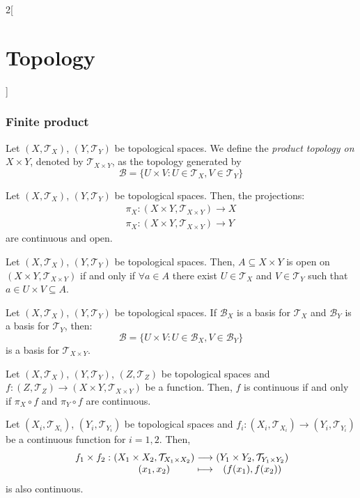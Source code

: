 \documentclass[../../../main.tex]{subfiles}
\begin{document}
\begin{multicols}{2}[\section{Topology}]
  \subsubsection{Finite product}
  \begin{definition}
    Let $(X,\mathcal{T}_X)$, $(Y,\mathcal{T}_Y)$ be topological spaces. We define the \textit{product topology on $X\times Y$}, denoted by $\mathcal{T}_{X\times Y}$, as the topology generated by $$\mathcal{B}=\{U\times V:U\in\mathcal{T}_X,V\in\mathcal{T}_Y\}$$
  \end{definition}
  \begin{prop}
    Let $(X,\mathcal{T}_X)$, $(Y,\mathcal{T}_Y)$ be topological spaces. Then, the projections:
    \begin{align*}
      \pi_X:(X\times Y,\mathcal{T}_{X\times Y})\longrightarrow X \\
      \pi_X:(X\times Y,\mathcal{T}_{X\times Y})\longrightarrow Y
    \end{align*}
    are continuous and open.
  \end{prop}
  \begin{prop}
    Let $(X,\mathcal{T}_X)$, $(Y,\mathcal{T}_Y)$ be topological spaces. Then, $A\subseteq X\times Y$ is open on $(X\times Y,\mathcal{T}_{X\times Y})$ if and only if $\forall a\in A$ there exist $U\in\mathcal{T}_X$ and $V\in\mathcal{T}_Y$ such that $a\in U\times V\subseteq A$.
  \end{prop}
  \begin{prop}
    Let $(X,\mathcal{T}_X)$, $(Y,\mathcal{T}_Y)$ be topological spaces. If $\mathcal{B}_X$ is a basis for $\mathcal{T}_X$ and $\mathcal{B}_Y$ is a basis for $\mathcal{T}_Y$, then: $$\mathcal{B}=\{U\times V:U\in\mathcal{B}_X,V\in\mathcal{B}_Y\}$$
    is a basis for $\mathcal{T}_{X\times Y}$.
  \end{prop}
  \begin{prop}
    Let $(X,\mathcal{T}_X)$, $(Y,\mathcal{T}_Y)$, $(Z,\mathcal{T}_Z)$ be topological spaces and $f:(Z,\mathcal{T}_Z)\rightarrow(X\times Y,\mathcal{T}_{X\times Y})$ be a function. Then, $f$ is continuous if and only if $\pi_X\circ f$ and $\pi_Y\circ f$ are continuous.
  \end{prop}
  \begin{prop}
    Let $(X_i,\mathcal{T}_{X_i})$, $(Y_i,\mathcal{T}_{Y_i})$ be topological spaces and $f_i:(X_i,\mathcal{T}_{X_i})\rightarrow(Y_i,\mathcal{T}_{Y_i})$ be a continuous function for $i=1,2$. Then,
    $$
      \function{f_1\times f_2}{(X_1\times X_2,\mathcal{T}_{X_1\times X_2})}{(Y_1\times Y_2,\mathcal{T}_{Y_1\times Y_2})}{(x_1,x_2)}{(f(x_1),f(x_2))}
    $$ is also continuous.
  \end{prop}

\end{multicols}
\end{document}
